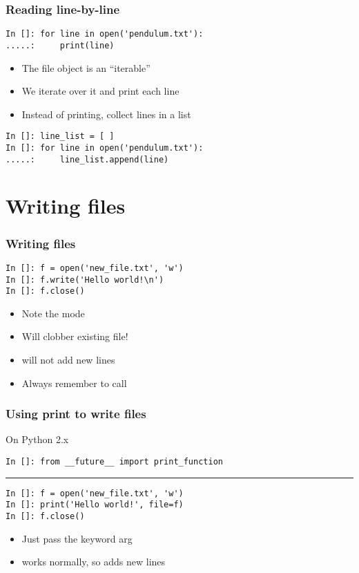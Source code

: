 \documentclass[14pt,compress]{beamer}
\begin{document}
\begin{frame}[fragile]
  \frametitle{Reading line-by-line}
  \begin{lstlisting}
In []: for line in open('pendulum.txt'):
.....:     print(line)
  \end{lstlisting}
  \begin{itemize}
  \item The file object is an ``iterable''
  \item We iterate over it and print each line
  \item Instead of printing, collect lines in a list
  \end{itemize}
  \begin{lstlisting}
In []: line_list = [ ]
In []: for line in open('pendulum.txt'):
.....:     line_list.append(line)
  \end{lstlisting}
\end{frame}

\section{Writing files}

\begin{frame}[fragile]
  \frametitle{Writing files}
  \begin{lstlisting}
In []: f = open('new_file.txt', 'w')
In []: f.write('Hello world!\n')
In []: f.close()
\end{lstlisting}
\begin{itemize}
\item Note the mode 
\item Will clobber existing file!
\item {} will not add new lines
\item Always remember to call 
\end{itemize}
\end{frame}

\begin{frame}[fragile]
  \frametitle{Using print to write files}
  \begin{small}
    On Python 2.x
  \begin{lstlisting}
In []: from __future__ import print_function
\end{lstlisting}
\hrule
\end{small}

  \begin{lstlisting}
In []: f = open('new_file.txt', 'w')
In []: print('Hello world!', file=f)
In []: f.close()
\end{lstlisting}
\begin{itemize}
\item Just pass the  keyword arg
\item {} works normally, so adds new lines
\end{itemize}
\end{frame}
\end{document}
